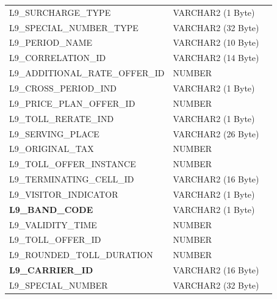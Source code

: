 \documentclass[12pt,twoside]{article}
\begin{document}
\begin{longtable}{lll}
 L9\_SURCHARGE\_TYPE                     &  VARCHAR2 (1 Byte)    &                            \\
 L9\_SPECIAL\_NUMBER\_TYPE               &  VARCHAR2 (32 Byte)   &                            \\
 L9\_PERIOD\_NAME                        &  VARCHAR2 (10 Byte)   &                            \\
 L9\_CORRELATION\_ID                     &  VARCHAR2 (14 Byte)   &                            \\
 L9\_ADDITIONAL\_RATE\_OFFER\_ID         &  NUMBER               &                            \\
 L9\_CROSS\_PERIOD\_IND                  &  VARCHAR2 (1 Byte)    &                            \\
 L9\_PRICE\_PLAN\_OFFER\_ID              &  NUMBER               &                            \\
 L9\_TOLL\_RERATE\_IND                   &  VARCHAR2 (1 Byte)    &                            \\
 L9\_SERVING\_PLACE                      &  VARCHAR2 (26 Byte)   &                            \\
 L9\_ORIGINAL\_TAX                       &  NUMBER               &                            \\
 L9\_TOLL\_OFFER\_INSTANCE               &  NUMBER               &                            \\
 L9\_TERMINATING\_CELL\_ID               &  VARCHAR2 (16 Byte)   &                            \\
 L9\_VISITOR\_INDICATOR                  &  VARCHAR2 (1 Byte)    &                            \\
 \textbf{L9\_BAND\_CODE}                 &  VARCHAR2 (1 Byte)    &                            \\
 L9\_VALIDITY\_TIME                      &  NUMBER               &                            \\
 L9\_TOLL\_OFFER\_ID                     &  NUMBER               &                            \\
 L9\_ROUNDED\_TOLL\_DURATION             &  NUMBER               &                            \\
 \textbf{L9\_CARRIER\_ID}                &  VARCHAR2 (16 Byte)   &                            \\
 L9\_SPECIAL\_NUMBER                     &  VARCHAR2 (32 Byte)   &                            \\

\end{longtable}
\end{document}
